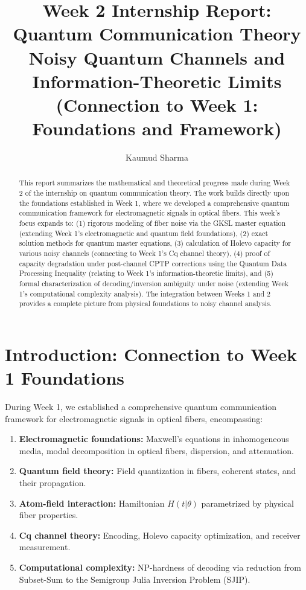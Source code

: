\documentclass[12pt,a4paper]{article}
\title{\textbf{Week 2 Internship Report: \\ Quantum Communication Theory \\ \large Noisy Quantum Channels and Information-Theoretic Limits \\ \large (Connection to Week 1: Foundations and Framework)}}
\author{Kaumud Sharma}
\date{}
\begin{document}
\maketitle

\begin{abstract}
This report summarizes the mathematical and theoretical progress made during Week 2 of the internship on quantum communication theory. The work builds directly upon the foundations established in Week 1, where we developed a comprehensive quantum communication framework for electromagnetic signals in optical fibers. This week's focus expands to: (1) rigorous modeling of fiber noise via the GKSL master equation (extending Week 1's electromagnetic and quantum field foundations), (2) exact solution methods for quantum master equations, (3) calculation of Holevo capacity for various noisy channels (connecting to Week 1's Cq channel theory), (4) proof of capacity degradation under post-channel CPTP corrections using the Quantum Data Processing Inequality (relating to Week 1's information-theoretic limits), and (5) formal characterization of decoding/inversion ambiguity under noise (extending Week 1's computational complexity analysis). The integration between Weeks 1 and 2 provides a complete picture from physical foundations to noisy channel analysis.
\end{abstract}

\newpage
\tableofcontents
\newpage

\section{Introduction: Connection to Week 1 Foundations}
\label{sec:connection_week1}

During Week 1, we established a comprehensive quantum communication framework for electromagnetic signals in optical fibers, encompassing:
\begin{enumerate}
    \item \textbf{Electromagnetic foundations:} Maxwell's equations in inhomogeneous media, modal decomposition in optical fibers, dispersion, and attenuation.
    \item \textbf{Quantum field theory:} Field quantization in fibers, coherent states, and their propagation.
    \item \textbf{Atom-field interaction:} Hamiltonian $H(t|\theta)$ parametrized by physical fiber properties.
    \item \textbf{Cq channel theory:} Encoding, Holevo capacity optimization, and receiver measurement.
    \item \textbf{Computational complexity:} NP-hardness of decoding via reduction from Subset-Sum to the Semigroup Julia Inversion Problem (SJIP).
\end{enumerate}
\end{document}
